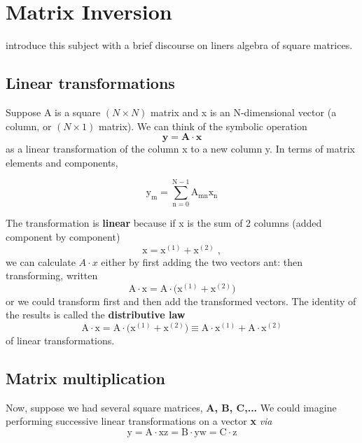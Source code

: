 \section{Matrix Inversion}
 introduce this subject with a brief discourse on liners algebra of square matrices.

\subsection{Linear transformations}
Suppose A is a square $(N\times N)$ matrix and x is an N-dimensional vector (a column, or $(N\times 1)$ matrix). We can think of the symbolic operation
\begin{equation}
    \label{eq:09_26}
    \mathbf{y= A \cdot x}
\end{equation} 
as a linear transformation of the column x to a new column y. In terms of matrix elements and components,

\begin{equation}
    \label{eq:09_27}
    \mathrm{y_m = \sum_{n=0}^{N-1} A_{mn} x_n}
\end{equation}

The transformation is \textbf{linear} because if x is the sum of 2 columns (added component by component)
\begin{equation}
    \label{eq:09_28}
    \mathrm{x=x^{(1)}+x^{(2)}\;,}
\end{equation}
we can calculate $A \cdot x$ either by first adding the two vectors ant:
then transforming, written
\begin{equation}
    \label{eq:09_29}
    \mathrm{A \cdot x = A \cdot \Big( x^{(1)}+x^{(2)} \Big)}
\end{equation}
or we could transform first and then add the transformed vectors. The identity of the results is called the \textbf{distributive law}
\begin{equation}
    \label{eq:09_30}
    \mathrm{A \cdot x = A \cdot \Big( x^{(1)}+x^{(2)} \Big) \equiv   A \cdot x^{(1)}+ A \cdot x^{(2)} }
\end{equation}
of linear transformations.

\subsection{Matrix multiplication}

Now, suppose we had several square matrices, \textbf{A, B, C,...} We could imagine performing successive linear transformations on a
vector \textbf{x} \textit{via}
\begin{subequations}
    \begin{equation}
        \label{eq:09_31a}
        \mathrm{ y= A \cdot x} %
    \end{equation}
    \begin{equation}
        \label{eq:09_31b}
        \mathrm{ z= B \cdot y} %
    \end{equation}
    \begin{equation}
        \label{eq:09_31c}
        \mathrm{ w = C \cdot z}  %
    \end{equation}
\end{subequations}

